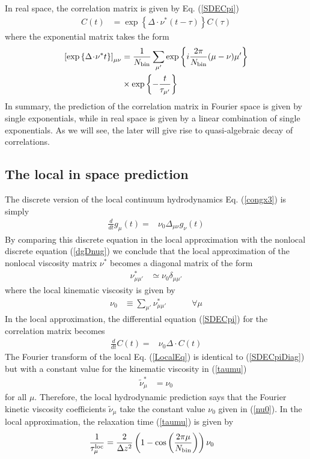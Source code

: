\documentclass[b5paper,openright,11pt]{book}
\newcommand{\esc}{\!\cdot\!}
\begin{document}
In real space, the correlation matrix is given by Eq. (\ref{SDECpi})
\begin{align}
  C(t)&=\exp\left\{\Delta\esc \nu^* (t-\tau) \right\}C(\tau)
\label{Cmunut}
\end{align}
where the exponential matrix takes the form
\begin{align}
\left[\exp\left\{\Delta\esc \nu^* t \right\}\right]_{\mu\nu}
&=\frac{1}{N_{\rm bin}}\sum_{\mu'}\exp\left\{i\frac{2\pi}{N_{\rm bin}}(\mu-\nu)\mu'\right\}
\nonumber\\
&\times
\exp\left\{-\frac{t}{\tau_{\mu'}}\right\}
\end{align}
In summary, the prediction of the correlation matrix in Fourier space
is given  by single exponentials, while  in real space is  given by a
linear combination of  single exponentials. As we will  see, the later
will give rise to quasi-algebraic decay of correlations.

\subsection{The local in space prediction}
The   discrete   version   of  the   local   continuum   hydrodynamics
Eq. (\ref{congx3}) is simply
\begin{align}
  \frac{d}{dt}{g}_\mu(t)=&\nu_0\Delta_{\mu\nu}{g}_\nu(t)
\label{gloc}
\end{align}
By comparing  this discrete equation  in the local  approximation with
the nonlocal  discrete equation  (\ref{dgDnug}) we conclude  that the
local approximation of the nonlocal viscosity matrix $\nu^*$ becomes a
diagonal matrix of the form
\begin{align}
\nu_{\mu\mu'}^*&\simeq \nu_0 \delta_{\mu\mu'}
\end{align}
where the local kinematic viscosity is given by
\begin{align}
\nu_0&\equiv \sum_{\mu'}\nu_{\mu\mu'}^* \quad \quad \quad\forall \mu
\label{nu0}
\end{align}
In the  local approximation, the differential  equation (\ref{SDECpi})
for the correlation matrix becomes
\begin{align}
  \frac{d}{dt}{C}(t)=&\nu_0{\Delta}\esc { C}(t)
\label{LocalEq}
\end{align}
The Fourier transform of the local Eq. (\ref{LocalEq}) is identical to
(\ref{SDECpiDiag})  but  with  a  constant  value  for  the  kinematic
viscosity in (\ref{taumu})
\begin{align}
\tilde{\nu}^*_\mu&= \nu_0
\label{numunu0}
\end{align}
for all $\mu$. Therefore, the  local hydrodynamic prediction says that
the Fourier kinetic viscosity  coefficients $\tilde{\nu}_\mu$ take the
constant value $\nu_0$ given in (\ref{nu0}).
In the local approximation, the relaxation time (\ref{taumu}) is given by 
\begin{align}
 \frac{1}{\tau^{\rm loc}_\mu}&=\frac{2}{\Delta z^2}
\left(1-\cos\left( \frac{2\pi \mu}{N_{\rm bin}}\right)\right)
\nu_0
\label{taumuloc}
\end{align}
\end{document}
